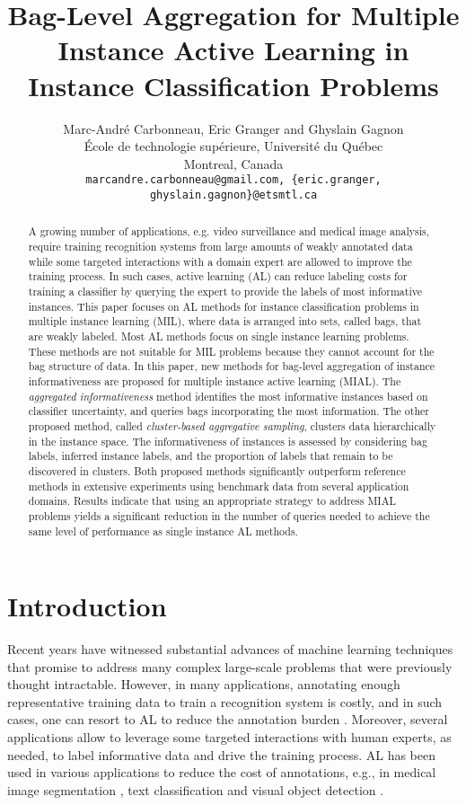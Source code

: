 \documentclass{article}
\title{Bag-Level Aggregation for Multiple Instance Active Learning in Instance Classification Problems}
\author{
  Marc-André Carbonneau, Eric Granger and Ghyslain Gagnon \\
  École de technologie supérieure, Université du Québec\\
  Montreal, Canada \\
  \texttt{marcandre.carbonneau@gmail.com, \{eric.granger, ghyslain.gagnon\}@etsmtl.ca} \\
}
\begin{document}
\maketitle

\begin{abstract}
A growing number of applications, e.g. video surveillance and medical image analysis, require training recognition systems from large amounts of weakly annotated data while some targeted interactions with a domain expert are allowed to improve the training process. In such cases, active learning (AL) can reduce labeling costs for training a classifier by querying the expert to provide the labels of most informative instances. This paper focuses on AL methods for instance classification problems in multiple instance learning (MIL), where data is arranged into sets, called bags, that are weakly labeled. Most AL methods focus on single instance learning problems. These methods are not suitable for MIL problems because they cannot account for the bag structure of data. In this paper, new methods for bag-level aggregation of instance informativeness are proposed for multiple instance active learning (MIAL). The \textit{aggregated informativeness} method identifies the most informative instances based on classifier uncertainty, and queries bags incorporating the most information. The other proposed method, called \textit{cluster-based aggregative sampling}, clusters data hierarchically in the instance space. The informativeness of instances is assessed by considering bag labels, inferred instance labels, and the proportion of labels that remain to be discovered in clusters. Both proposed methods significantly outperform reference methods in extensive experiments using benchmark data from several application domains. Results indicate that using an appropriate strategy to address MIAL problems yields a significant reduction in the number of queries needed to achieve the same level of performance as single instance AL methods.
\end{abstract}



\section{Introduction}
\label{sec:introduction}

Recent years have witnessed substantial advances of machine learning techniques that promise to address many complex large-scale problems that were previously thought intractable. However, in many applications, annotating enough representative training data to train a recognition system is costly, and in such cases, one can resort to AL to reduce the annotation burden \cite{Freund1997QC,Dasgupta2011twofaces}. Moreover, several applications allow to leverage some targeted interactions with human experts, as needed, to label informative data and drive the training process. AL has been used in various applications to reduce the cost of annotations, e.g., in medical image segmentation \cite{Konyushkova2015}, text classification \cite{Tong2001,Hoi2006text} and visual object detection \cite{Vijayanarasimhan2014}. 
\end{document}
